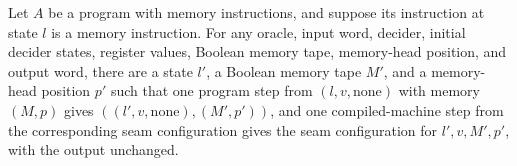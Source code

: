 \begin{lemma}
\label{Complexity.LogProg.mmem_step}
\leanok
{}
Let $A$ be a program with memory instructions, and suppose its instruction at state $l$
is a memory instruction. For any oracle, input word, decider, initial decider states,
register values, Boolean memory tape, memory-head position, and output word, there are a
state $l'$, a Boolean memory tape $M'$, and a memory-head position $p'$ such that one
program step from $(l,v,\mathrm{none})$ with memory $(M,p)$ gives
$((l',v,\mathrm{none}),(M',p'))$, and one compiled-machine step from the corresponding
seam configuration gives the seam configuration for $l',v,M',p'$, with the output
unchanged.
\end{lemma}
